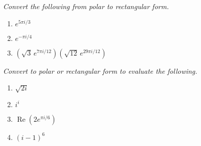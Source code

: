\documentclass[11pt]{article}
\newcommand{\re}{\operatorname{Re}}
\begin{document}
\noindent
\textit{Convert the following from polar to rectangular form.}
\begin{multicols}{3}
\begin{enumerate}
\setcounter{enumi}{\theenumCount}
\item $e^{5\pi i/3}$
\item $e^{-\pi i /4}$
\item $(\sqrt{3}\, e^{7\pi i /12}) (\sqrt{12}\, e^{29 \pi i/ 12})$
\setcounter{enumCount}{\theenumi}
\end{enumerate}
\end{multicols}
\vfill

\noindent
\textit{Convert to polar or rectangular form to evaluate the following.}
\begin{multicols}{4}
\begin{enumerate}
\setcounter{enumi}{\theenumCount}
\item $\sqrt{2i}$
\item $i^i$
\item $\re \left( 2e^{\pi i/6}\right)$
\item $(i-1)^6$
\setcounter{enumCount}{\theenumi}
\end{enumerate}
\end{multicols}
\vfill

\end{document}
